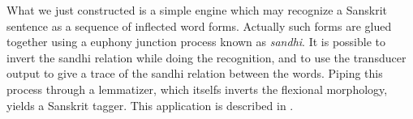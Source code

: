 
What we just constructed is a simple engine which may recognize a Sanskrit sentence 
as a sequence of inflected word forms. Actually such forms are glued together 
using a euphony junction
process known as {\sl sandhi}. It is possible to invert the sandhi relation while doing
the recognition, and to use the transducer output to give a trace of the sandhi relation
between the words. Piping this process through a lemmatizer, which itselfs inverts the
flexional morphology, yields a Sanskrit tagger. This application is described in
\cite{2004-Huet-1}. 


